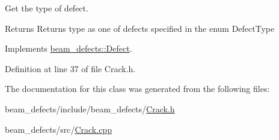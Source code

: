 Get the type of defect. 

\begin{DoxyReturn}{Returns}
Returns type as one of defects specified in the enum Defect\+Type 
\end{DoxyReturn}


Implements \hyperlink{classbeam__defects_1_1_defect_aab237fd856c7ace882ead216c81574e6}{beam\+\_\+defects\+::\+Defect}.



Definition at line 37 of file Crack.\+h.



The documentation for this class was generated from the following files\+:\begin{DoxyCompactItemize}
\item 
beam\+\_\+defects/include/beam\+\_\+defects/\hyperlink{_crack_8h}{Crack.\+h}\item 
beam\+\_\+defects/src/\hyperlink{_crack_8cpp}{Crack.\+cpp}\end{DoxyCompactItemize}
